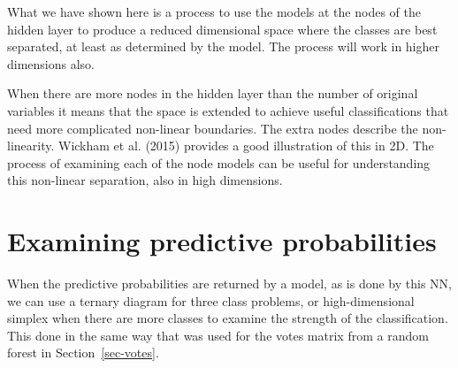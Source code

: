 \documentclass[
  letterpaper,
]{krantz}
\newenvironment{Shaded}{\begin{snugshade}}{\end{snugshade}}
\newcommand{\AttributeTok}[1]{\textcolor[rgb]{0.40,0.45,0.13}{#1}}
\newcommand{\CommentTok}[1]{\textcolor[rgb]{0.37,0.37,0.37}{#1}}
\newcommand{\DecValTok}[1]{\textcolor[rgb]{0.68,0.00,0.00}{#1}}
\newcommand{\FunctionTok}[1]{\textcolor[rgb]{0.28,0.35,0.67}{#1}}
\newcommand{\NormalTok}[1]{\textcolor[rgb]{0.00,0.23,0.31}{#1}}
\newcommand{\OtherTok}[1]{\textcolor[rgb]{0.00,0.23,0.31}{#1}}
\newcommand{\SpecialCharTok}[1]{\textcolor[rgb]{0.37,0.37,0.37}{#1}}
\begin{document}
What we have shown here is a process to use the models at the nodes of
the hidden layer to produce a reduced dimensional space where the
classes are best separated, at least as determined by the model. The
process will work in higher dimensions also.

When there are more nodes in the hidden layer than the number of
original variables it means that the space is extended to achieve useful
classifications that need more complicated non-linear boundaries. The
extra nodes describe the non-linearity. Wickham et al. (2015) provides a
good illustration of this in 2D. The process of examining each of the
node models can be useful for understanding this non-linear separation,
also in high dimensions.

\section{Examining predictive
probabilities}\label{examining-predictive-probabilities}


When the predictive probabilities are returned by a model, as is done by
this NN, we can use a ternary diagram for three class problems, or
high-dimensional simplex when there are more classes to examine the
strength of the classification. This done in the same way that was used
for the votes matrix from a random forest in Section~\ref{sec-votes}.

\begin{Shaded}
\end{Shaded}
\end{document}
